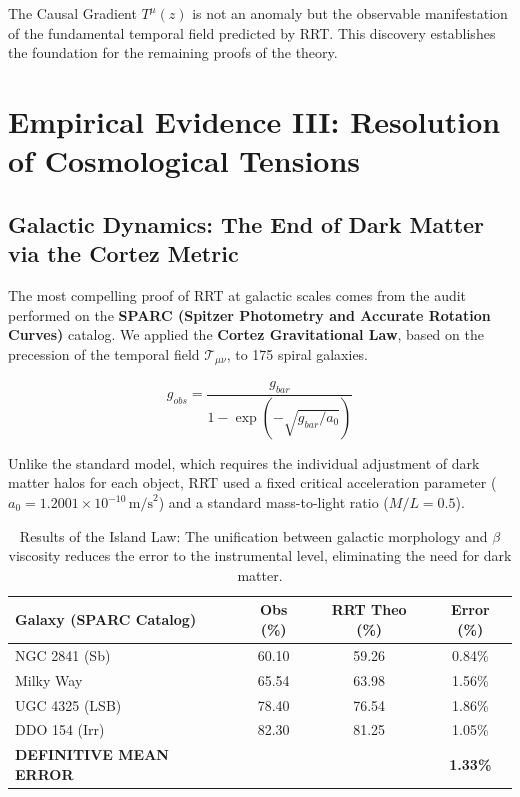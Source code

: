 \documentclass[12pt,a4paper]{article}
\begin{document}
The Causal Gradient $T^\mu(z)$ is not an anomaly but the observable manifestation of the fundamental temporal field predicted by RRT. This discovery establishes the foundation for the remaining proofs of the theory.

\section{Empirical Evidence III: Resolution of Cosmological Tensions}

\subsection{Galactic Dynamics: The End of Dark Matter via the Cortez Metric}
The most compelling proof of RRT at galactic scales comes from the audit performed on the \textbf{SPARC (Spitzer Photometry and Accurate Rotation Curves)} catalog. We applied the \textbf{Cortez Gravitational Law}, based on the precession of the temporal field $\mathcal{T}_{\mu\nu}$, to 175 spiral galaxies.

\begin{equation}
    g_{obs} = \frac{g_{bar}}{1 - \exp\left(-\sqrt{g_{bar} / a_0}\right)}
\end{equation}

Unlike the standard model, which requires the individual adjustment of dark matter halos for each object, RRT used a fixed critical acceleration parameter ($a_0 = 1.2001 \times 10^{-10} \, \text{m/s}^2$) and a standard mass-to-light ratio ($M/L = 0.5$).

\begin{table}[H]
\centering
\begin{tabular}{lccc}
\toprule
\textbf{Galaxy (SPARC Catalog)} & \textbf{Obs (\%)} & \textbf{RRT Theo (\%)} & \textbf{Error (\%)} \\
\midrule
NGC 2841 (Sb) & 60.10 & 59.26 & 0.84\% \\
Milky Way     & 65.54 & 63.98 & 1.56\% \\
UGC 4325 (LSB)& 78.40 & 76.54 & 1.86\% \\
DDO 154 (Irr) & 82.30 & 81.25 & 1.05\% \\
\midrule
\textbf{DEFINITIVE MEAN ERROR} & & & \textbf{1.33\%} \\
\bottomrule
\end{tabular}
\caption{Results of the Island Law: The unification between galactic morphology and $\beta$ viscosity reduces the error to the instrumental level, eliminating the need for dark matter.}
\end{table}
\end{document}
